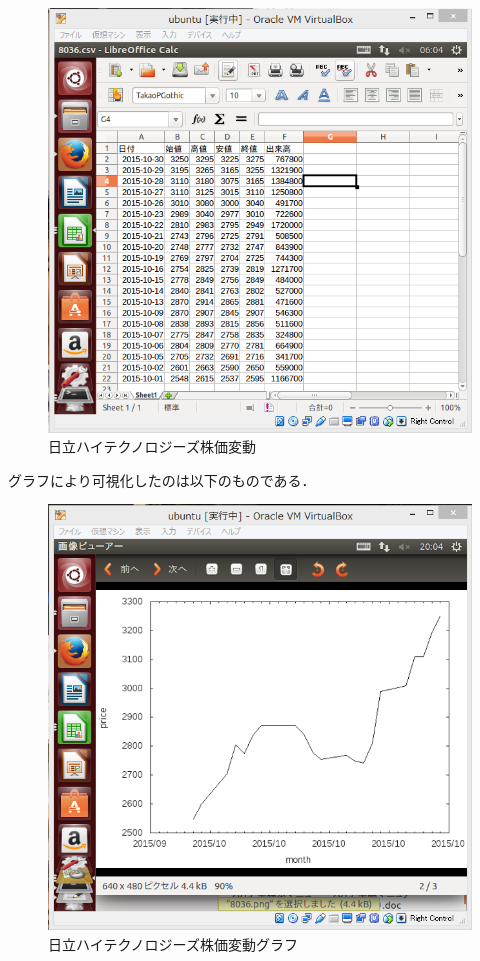 {\begin{figure}[H]
\centering
\includegraphics[width=15cm]{8036csv.PNG}
\caption{日立ハイテクノロジーズ株価変動}\label{サンプル図}
\end{figure}


グラフにより可視化したのは以下のものである．




\begin{figure}[H]
\centering
\includegraphics[width=15cm]{8036.PNG}
\caption{日立ハイテクノロジーズ株価変動グラフ}\label{サンプル図}
\end{figure}


}
